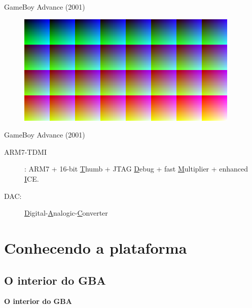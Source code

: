 \documentclass{beamer}
\begin{document}
\begin{darkframes}
\begin{frame}{GameBoy Advance (2001)}
\begin{multicols}{2}
\begin{figure}[h!]
        \end{figure}
        \begin{figure}[h!]
            \centering
            \includegraphics[height=.2\textheight]{snes_palette}
        \end{figure}
    \end{multicols}
\end{frame}

\begin{frame}{GameBoy Advance (2001)}
    \begin{description}
        \item[ARM7-TDMI]: ARM7 + 16-bit \underline{T}humb + JTAG
            \underline{D}ebug + fast \underline{M}ultiplier + enhanced
            \underline{I}CE.
        \item[DAC:]
            \underline{D}igital-\underline{A}nalogic-\underline{C}onverter
    \end{description}
\end{frame}

\section{Conhecendo a plataforma}
\subsection{O interior do GBA}
\begin{frame}{}
    \huge \textbf{O interior do GBA}
\end{frame}


\end{darkframes}
\end{document}
